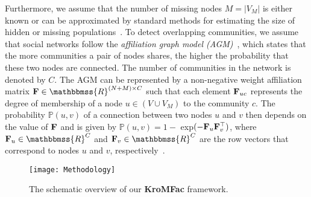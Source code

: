 \documentclass[format=acmsmall, review=false, screen=true]{acmart}
\newcommand{\R}{\mathbbmss{R}}
\begin{document}
Furthermore, we assume that the number of missing nodes $M = |V_M|$ is either known or can be approximated by standard methods for estimating the size of hidden or missing populations~\cite{estimatepopulation}. To detect overlapping communities, we assume that social networks follow the {\em affiliation graph model (AGM)}~\cite{agm}, which states that the more communities a pair of nodes shares, the higher the probability that these two nodes are connected. The number of communities in the network is denoted by $C$. The AGM can be represented by a non-negative weight affiliation matrix ${\bf F} \in \R^{(N + M) \times C}$ such that each element ${\bf F}_{uc}$ represents the degree of membership of a node $u \in (V\cup V_M)$ to the community $c$. The probability $\mathbb{P}(u,v)$ of a connection between two nodes $u$ and $v$ then depends on the value of ${\bf F}$ and is given by $\mathbb{P}(u,v) = 1 - $ exp$(-{\bf F}_{u} {\bf F}^{\top}_{v})$, where ${\bf F}_{u} \in \R^C$ and ${\bf F}_{v} \in \R^C$ are the row vectors that correspond to nodes $u$ and $v$, respectively~\cite{bigclam}. 
\begin{figure*}[t]
    \begin{center}
            \texttt{[image: Methodology]}
	\hspace{2mm}
            \caption{{The schematic overview of our \textbf{\textsf{KroMFac}} framework.} }
            \label{fig:methodology}
    \end{center}
\vspace{-0.15in}
\end{figure*}
\end{document}
